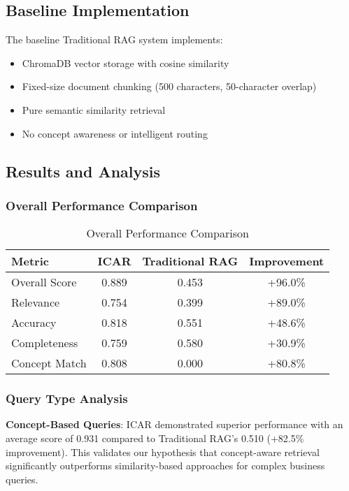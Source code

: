 \documentclass[11pt]{article}
\begin{document}
\subsection{Baseline Implementation}

The baseline Traditional RAG system implements:
\begin{itemize}
\item ChromaDB vector storage with cosine similarity
\item Fixed-size document chunking (500 characters, 50-character overlap)
\item Pure semantic similarity retrieval
\item No concept awareness or intelligent routing
\end{itemize}

\subsection{Results and Analysis}

\subsubsection{Overall Performance Comparison}

\begin{table}[h!]
\centering
\begin{tabular}{lccc}
\toprule
Metric & ICAR & Traditional RAG & Improvement \\
\midrule
Overall Score & 0.889 & 0.453 & +96.0\% \\
Relevance & 0.754 & 0.399 & +89.0\% \\
Accuracy & 0.818 & 0.551 & +48.6\% \\
Completeness & 0.759 & 0.580 & +30.9\% \\
Concept Match & 0.808 & 0.000 & +80.8\% \\
\bottomrule
\end{tabular}
\caption{Overall Performance Comparison}
\end{table}

\subsubsection{Query Type Analysis}

\textbf{Concept-Based Queries}: ICAR demonstrated superior performance with an average score of 0.931 compared to Traditional RAG's 0.510 (+82.5\% improvement). This validates our hypothesis that concept-aware retrieval significantly outperforms similarity-based approaches for complex business queries.
\end{document}
